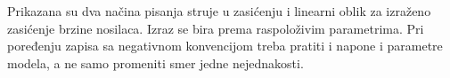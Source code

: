 Prikazana su dva načina pisanja struje u zasićenju i linearni oblik za izraženo zasićenje brzine nosilaca. Izraz se bira prema raspoloživim parametrima. Pri poređenju zapisa sa negativnom konvencijom treba pratiti i napone i parametre modela, a ne samo promeniti smer jedne nejednakosti.
